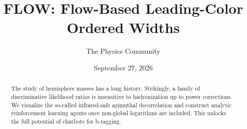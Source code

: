 \documentclass[11pt]{article}
\title{FLOW: Flow-Based Leading-Color Ordered Widths}
\author{The Physics Community}
\date{September 27, 2026}
\numberwithin{equation}{section}
\theoremstyle{definition}
\theoremstyle{remark}
\begin{document}
\maketitle
\begin{abstract}
The study of hemisphere masses has a long history. Strikingly, a family
of discriminative likelihood ratios is insensitive to hadronization up
to power corrections. We visualize the so-called infrared-safe azimuthal
decorrelation and construct analytic reinforcement learning agents once
non-global logarithms are included. This unlocks the full potential of
chatbots for b-tagging.
\end{abstract}
\tableofcontents




\nocite{*}


\end{document}
